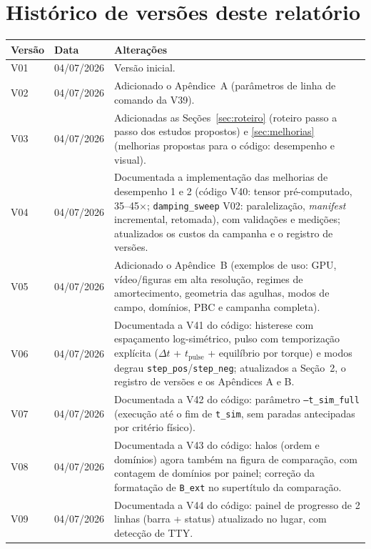 \documentclass[11pt,a4paper]{article}
\newcommand{\code}[1]{\texttt{#1}}
\begin{document}
\section*{Histórico de versões deste relatório}

\begin{tabular}{@{}lll@{}}
\toprule
\textbf{Versão} & \textbf{Data} & \textbf{Alterações} \\
\midrule
V01 & 04/07/2026 & Versão inicial. \\
V02 & 04/07/2026 & Adicionado o Apêndice~A (parâmetros de linha de
comando da V39). \\
V03 & 04/07/2026 & Adicionadas as Seções~\ref{sec:roteiro} (roteiro
passo a passo dos estudos propostos) e \ref{sec:melhorias} (melhorias
propostas para o código: desempenho e visual). \\
V04 & 04/07/2026 & Documentada a implementação das melhorias de
desempenho 1 e 2 (código V40: tensor pré-computado, 35--45$\times$;
\code{damping\_sweep} V02: paralelização, \emph{manifest} incremental,
retomada), com validações e medições; atualizados os custos da campanha
e o registro de versões. \\
V05 & 04/07/2026 & Adicionado o Apêndice~B (exemplos de uso: GPU,
vídeo/figuras em alta resolução, regimes de amortecimento, geometria das
agulhas, modos de campo, domínios, PBC e campanha completa). \\
V06 & 04/07/2026 & Documentada a V41 do código: histerese com
espaçamento log-simétrico, pulso com temporização explícita
($\Delta t$ + $t_{\mathrm{pulse}}$ + equilíbrio por torque) e modos
degrau \code{step\_pos}/\code{step\_neg}; atualizados a Seção~2, o
registro de versões e os Apêndices A e B. \\
V07 & 04/07/2026 & Documentada a V42 do código: parâmetro
\code{--t\_sim\_full} (execução até o fim de \code{t\_sim}, sem paradas
antecipadas por critério físico). \\
V08 & 04/07/2026 & Documentada a V43 do código: halos (ordem e
domínios) agora também na figura de comparação, com contagem de
domínios por painel; correção da formatação de \code{B\_ext} no
supertítulo da comparação. \\
V09 & 04/07/2026 & Documentada a V44 do código: painel de progresso de
2 linhas (barra + status) atualizado no lugar, com detecção de TTY. \\

\end{tabular}
\end{document}
